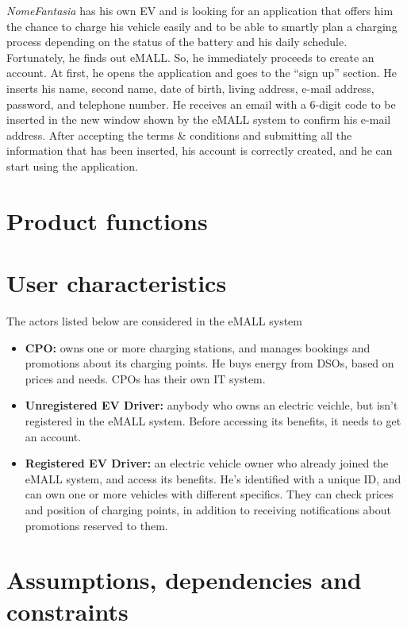 \textit{NomeFantasia} has his own EV and is looking for an application that offers him the chance to charge his vehicle
easily and to be able to smartly plan a charging process depending on the status of the battery and his daily schedule.
Fortunately, he finds out eMALL. So, he immediately proceeds to create an account.
At first, he opens the application and goes to the “sign up” section.
He inserts his name, second name, date of birth, living address, e-mail address, password, and telephone number.
He receives an email with a 6-digit code to be inserted in the new window shown by the eMALL system to confirm his e-mail address.
After accepting the terms \& conditions and submitting all the information that has been inserted, his account is correctly
created, and he can start using the application.

\section{Product functions}\label{sec:product_functions}


\section{User characteristics}\label{sec:user_characteristics}
The actors listed below are considered in the eMALL system
\begin{itemize}
	\item \textbf{CPO:} owns one or more charging stations, and manages bookings and promotions about its charging points. He buys energy from DSOs, based on prices and needs. CPOs has their own IT system.
	\item \textbf{Unregistered EV Driver:} anybody who owns an electric veichle, but isn’t registered in the eMALL system. Before accessing its benefits, it needs to get an account.
	\item \textbf{Registered EV Driver:} an electric vehicle owner who already joined the eMALL system, and access its benefits. He’s identified with a unique ID, and can own one or more vehicles with different specifics. They can check prices and position of charging points, in addition to receiving notifications about promotions reserved to them.
\end{itemize}

\section{Assumptions, dependencies and constraints}\label{sec:assumptions_dependencies_and_constraints}